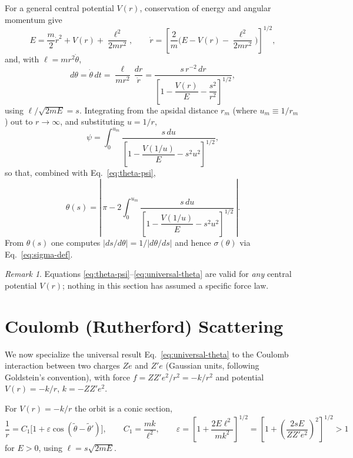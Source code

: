 \documentclass[11pt]{article}
\theoremstyle{remark}
\newtheorem{remark}{Remark}
\begin{document}
For a general central potential $V(r)$, conservation of energy and angular
momentum give
\[
  E = \frac{m}{2}\dot r^2 + V(r) + \frac{\ell^2}{2mr^2}, \qquad
  \dot r = \left[\frac{2}{m}\Big(E - V(r) - \frac{\ell^2}{2mr^2}\Big)\right]^{1/2},
\]
and, with $\ell = mr^2\dot\theta$,
\[
  d\theta = \dot\theta\,dt = \frac{\ell}{mr^2}\,\frac{dr}{\dot r}
  = \frac{s\,r^{-2}\,dr}{\left[1 - \dfrac{V(r)}{E} - \dfrac{s^2}{r^2}\right]^{1/2}},
\]
using $\ell/\sqrt{2mE} = s$. Integrating from the apsidal distance $r_m$ (where
$u_m \equiv 1/r_m$) out to $r\to\infty$, and substituting $u=1/r$,
\begin{equation}
  \psi = \int_0^{u_m} \frac{s\,du}{\left[1 - \dfrac{V(1/u)}{E} - s^2u^2\right]^{1/2}},
\end{equation}
so that, combined with Eq.~\eqref{eq:theta-psi},
\begin{equation}
  \boxed{\theta(s) = \left|\,\pi - 2\int_0^{u_m} \frac{s\,du}{\left[1-\dfrac{V(1/u)}{E}-s^2u^2\right]^{1/2}}\,\right|}.
  \label{eq:universal-theta}
\end{equation}
From $\theta(s)$ one computes $|ds/d\theta| = 1/|d\theta/ds|$ and hence
$\sigma(\theta)$ via Eq.~\eqref{eq:sigma-def}.

\begin{remark}
Equations \eqref{eq:theta-psi}--\eqref{eq:universal-theta} are valid for
\emph{any} central potential $V(r)$; nothing in this section has assumed a
specific force law.
\end{remark}

\section{Coulomb (Rutherford) Scattering}

We now specialize the universal result Eq.~\eqref{eq:universal-theta} to the
Coulomb interaction between two charges $Ze$ and $Z'e$ (Gaussian units,
following Goldstein's convention), with force $f = ZZ'e^2/r^2 = -k/r^2$ and
potential $V(r) = -k/r$, $k = -ZZ'e^2$.

For $V(r) = -k/r$ the orbit is a conic section,
\begin{equation}
  \frac{1}{r} = C_1\big[1 + \varepsilon\cos(\tilde\theta - \tilde\theta')\big],
  \qquad C_1 = \frac{mk}{\ell^2}, \qquad
  \varepsilon = \left[1 + \frac{2E\ell^2}{mk^2}\right]^{1/2}
             = \left[1 + \left(\frac{2sE}{ZZ'e^2}\right)^{2}\right]^{1/2} > 1
  \label{eq:orbit}
\end{equation}
for $E>0$, using $\ell = s\sqrt{2mE}$.
\end{document}
